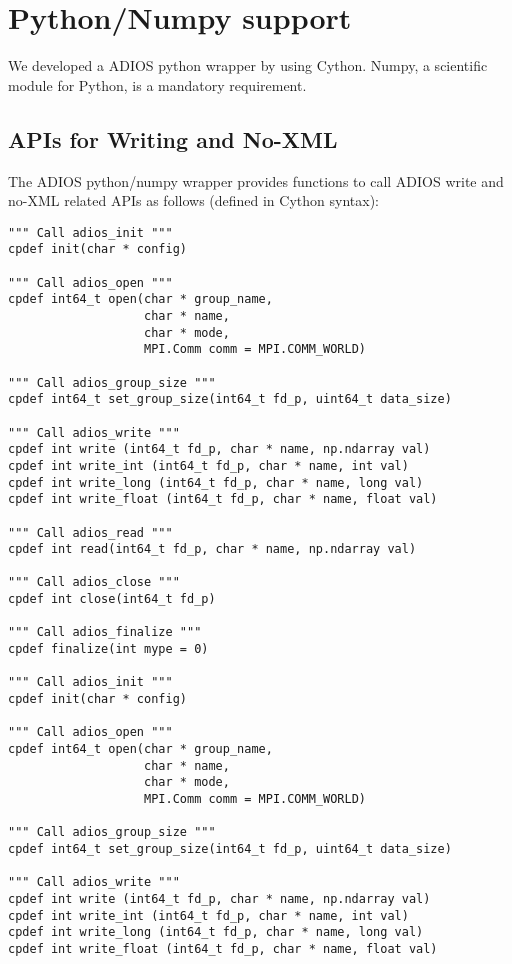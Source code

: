 \section{Python/Numpy support}
\label{section-bindings-numpy}
We developed a ADIOS python wrapper by using Cython. Numpy, a scientific module for Python, is a mandatory requirement. 

\subsection{APIs for Writing and No-XML}
The ADIOS python/numpy wrapper provides functions to call ADIOS write and no-XML related APIs as follows (defined in Cython syntax):
\begin{lstlisting}[language=cython,caption={Functions for writing and No-XML},label={},]
""" Call adios_init """
cpdef init(char * config)

""" Call adios_open """
cpdef int64_t open(char * group_name,
                   char * name,
                   char * mode,
                   MPI.Comm comm = MPI.COMM_WORLD)

""" Call adios_group_size """
cpdef int64_t set_group_size(int64_t fd_p, uint64_t data_size)

""" Call adios_write """
cpdef int write (int64_t fd_p, char * name, np.ndarray val)
cpdef int write_int (int64_t fd_p, char * name, int val)
cpdef int write_long (int64_t fd_p, char * name, long val)
cpdef int write_float (int64_t fd_p, char * name, float val)

""" Call adios_read """
cpdef int read(int64_t fd_p, char * name, np.ndarray val)

""" Call adios_close """
cpdef int close(int64_t fd_p)

""" Call adios_finalize """
cpdef finalize(int mype = 0)

""" Call adios_init """
cpdef init(char * config)

""" Call adios_open """
cpdef int64_t open(char * group_name,
                   char * name,
                   char * mode,
                   MPI.Comm comm = MPI.COMM_WORLD)

""" Call adios_group_size """
cpdef int64_t set_group_size(int64_t fd_p, uint64_t data_size)

""" Call adios_write """
cpdef int write (int64_t fd_p, char * name, np.ndarray val)
cpdef int write_int (int64_t fd_p, char * name, int val)
cpdef int write_long (int64_t fd_p, char * name, long val)
cpdef int write_float (int64_t fd_p, char * name, float val)


\end{lstlisting}
